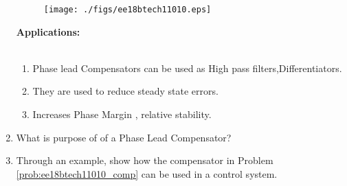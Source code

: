 \begin{enumerate}[label=\thesection.\arabic*.,ref=\thesection.\theenumi]
\begin{figure}[htp]
	\centering
	\texttt{[image: ./figs/ee18btech11010.eps]}
	\caption{}
	\label{fig:ee18btech11010}
\end{figure}
 
\textbf{Applications:}\\ \\
\begin{enumerate}
  \item Phase lead Compensators can be used as High pass filters,Differentiators.
  \item They are used to reduce steady state errors. 
  \item Increases Phase Margin , relative stability.
\end{enumerate}
\item What is purpose of of a Phase Lead Compensator?
\item Through an example, show how the compensator in Problem \ref{prob:ee18btech11010_comp} can be used in a control system.



\end{enumerate}


